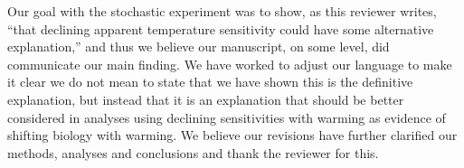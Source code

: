 \documentclass[11pt,letter]{article}
\begin{document}
Our goal with the stochastic experiment was to show, as this reviewer writes, ``that declining apparent temperature sensitivity could have some alternative explanation,'' and thus we believe our manuscript, on some level, did communicate our main finding. We have worked to adjust our language to make it clear we do not mean to state that we have shown this is the definitive explanation, but instead that it is an explanation that should be better considered in analyses using declining sensitivities with warming as evidence of shifting biology with warming. We believe our revisions have further clarified our methods, analyses and conclusions and thank the reviewer for this.
\end{document}
